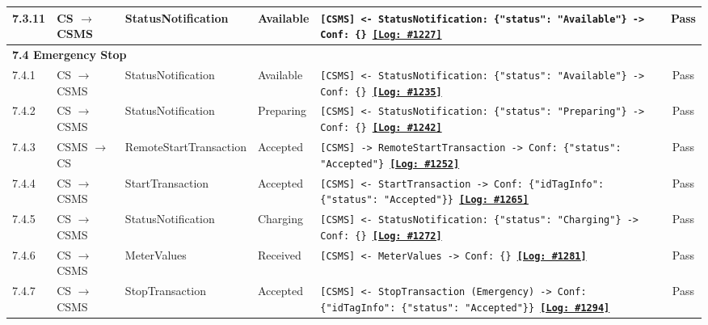 \documentclass[10pt, a4paper, landscape]{article}
\begin{document}
\begin{longtable}{|p{1.0cm}|p{2.5cm}|p{4.0cm}|p{5.0cm}|p{10.0cm}|c|}
\hline
7.3.11 & CS $\to$ CSMS & StatusNotification & Available & \footnotesize\texttt{[CSMS] <- StatusNotification: \{"status": "Available"\} \newline [CSMS] -> Conf: \{\} \newline \hyperref[log:7.3.11]{\textbf{[Log: \#1227]}}} & Pass \\
\hline
\multicolumn{6}{|l|}{\textbf{7.4 Emergency Stop}} \\
\hline
7.4.1 & CS $\to$ CSMS & StatusNotification & Available & \footnotesize\texttt{[CSMS] <- StatusNotification: \{"status": "Available"\} \newline [CSMS] -> Conf: \{\} \newline \hyperref[log:7.4.1]{\textbf{[Log: \#1235]}}} & Pass \\
\hline
7.4.2 & CS $\to$ CSMS & StatusNotification & Preparing & \footnotesize\texttt{[CSMS] <- StatusNotification: \{"status": "Preparing"\} \newline [CSMS] -> Conf: \{\} \newline \hyperref[log:7.4.2]{\textbf{[Log: \#1242]}}} & Pass \\
\hline
7.4.3 & CSMS $\to$ CS & RemoteStartTransaction & Accepted & \footnotesize\texttt{[CSMS] -> RemoteStartTransaction \newline [CS] -> Conf: \{"status": "Accepted"\} \newline \hyperref[log:7.4.3]{\textbf{[Log: \#1252]}}} & Pass \\
\hline
7.4.4 & CS $\to$ CSMS & StartTransaction & Accepted & \footnotesize\texttt{[CSMS] <- StartTransaction \newline [CSMS] -> Conf: \{"idTagInfo": \{"status": "Accepted"\}\} \newline \hyperref[log:7.4.4]{\textbf{[Log: \#1265]}}} & Pass \\
\hline
7.4.5 & CS $\to$ CSMS & StatusNotification & Charging & \footnotesize\texttt{[CSMS] <- StatusNotification: \{"status": "Charging"\} \newline [CSMS] -> Conf: \{\} \newline \hyperref[log:7.4.5]{\textbf{[Log: \#1272]}}} & Pass \\
\hline
7.4.6 & CS $\to$ CSMS & MeterValues & Received & \footnotesize\texttt{[CSMS] <- MeterValues \newline [CSMS] -> Conf: \{\} \newline \hyperref[log:7.4.6]{\textbf{[Log: \#1281]}}} & Pass \\
\hline
7.4.7 & CS $\to$ CSMS & StopTransaction & Accepted & \footnotesize\texttt{[CSMS] <- StopTransaction (Emergency) \newline [CSMS] -> Conf: \{"idTagInfo": \{"status": "Accepted"\}\} \newline \hyperref[log:7.4.7]{\textbf{[Log: \#1294]}}} & Pass \\

\end{longtable}
\end{document}
